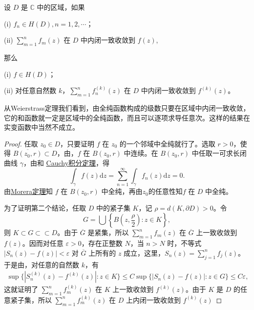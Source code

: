 \documentclass[../../main.tex]{subfiles}%
\begin{document}
\begin{theorem}\label{theorem:Weierstrass定理}
设 \( D \) 是 \( \mathbb{C} \) 中的区域，如果

(i) \( f_n \in H(D), n = 1, 2, \cdots \)；

(ii) \( \sum_{m=1}^{n} f_m(z) \) 在 \( D \) 中内闭一致收敛到 \( f(z) \),

那么

(i) \( f \in H(D) \)；

(ii) 对任意自然数 \( k \)，\( \sum_{m=1}^{n} f_n^{(k)}(z) \) 在 \( D \) 中内闭一致收敛到 \( f^{(k)}(z) \)。
\end{theorem}
\begin{note}
从Weierstrass定理我们看到，由全纯函数构成的级数只要在区域中内闭一致收敛，它的和函数就一定是区域中的全纯函数，而且可以逐项求导任意次。这样的结果在实变函数中当然不成立。
\end{note}
\begin{proof}

任取 \( z_0 \in D \)，只要证明 \( f \) 在 \( z_0 \) 的一个邻域中全纯就行了。选取 \( r > 0 \)，使得 \( \overline{B(z_0, r)} \subset D \)，由，\( f \) 在 \( B(z_0, r) \) 中连续。在 \( B(z_0, r) \) 中任取一可求长闭曲线 \( \gamma \)，由和 \hyperref[theorem:Cauchy-Goursat定理(Cauchy积分定理)]{Cauchy积分定理}，得
\[
\int_{\gamma} f(z) \mathrm{d}z = \sum_{n=1}^{\infty} \int_{\gamma} f_n(z) \mathrm{d}z = 0.
\]
由\hyperref[theorem:Morera(莫雷拉)定理]{Morera定理}知 \( f \) 在 \( B(z_0, r) \) 中全纯，再由$z_0$的任意性知\( f \) 在 \( D \) 中全纯。

为了证明第二个结论，任取 \( D \) 中的紧子集 \( K \)，记 \( \rho = d(K, \partial D) > 0 \)。令
\[
G = \bigcup\left\{ B\left(z, \frac{\rho}{2}\right) : z \in K \right\},
\]
则 \( K \subset G \subset\subset D \)。由于 \( \overline{G} \) 是紧集，所以 \( \sum_{m=1}^{n} f_m(z) \) 在 \( \overline{G} \) 上一致收敛到 \( f(z) \)。因而对任意 \( \varepsilon > 0 \)，存在正整数 \( N \)，当 \( n > N \) 时，不等式 \( |S_n(z) - f(z)| < \varepsilon \) 对 \( \overline{G} \) 上所有的 \( z \) 成立，这里，\( S_n(z) = \sum_{j=1}^{n} f_j(z) \)。于是由，对任意的自然数 \( k \)，有
\begin{align*}
\sup\{|S_n^{(k)}(z) - f^{(k)}(z)| : z \in K\} \leqslant C\sup\{|S_n(z) - f(z)| : z \in G\} \leqslant C\varepsilon,
\end{align*}
这就证明了 \( \sum_{m=1}^{n} f_m^{(k)}(z) \) 在 \( K \) 上一致收敛到 \( f^{(k)}(z) \)。由于 \( K \) 是 \( D \) 的任意紧子集，所以 \( \sum_{m=1}^{n} f_m^{(k)}(z) \) 在 \( D \) 上内闭一致收敛到 \( f^{(k)}(z) \)

\end{proof}
\end{document}
